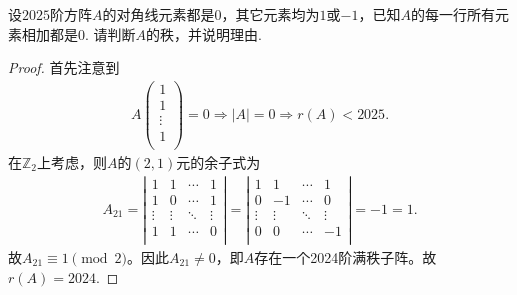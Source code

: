 \documentclass[../../main.tex]{subfiles}%
\begin{document}
\begin{example}
设$2025$阶方阵$A$的对角线元素都是$0$，其它元素均为$1$或$-1$，已知$A$的每一行所有元素相加都是$0$. 请判断$A$的秩，并说明理由.
\end{example}
\begin{proof}

首先注意到
\begin{align*}
A\left( \begin{array}{c}
1\\
1\\
\vdots\\
1\\
\end{array} \right) =0\Longrightarrow \left| A \right|=0\Longrightarrow r\left( A \right) <2025.
\end{align*}
在$\mathbb{Z}_2$上考虑，则$A$的$(2,1)$元的余子式为
\begin{align*}
A_{21}=\left| \begin{matrix}
1&		1&		\cdots&		1\\
1&		0&		\cdots&		1\\
\vdots&		\vdots&		\ddots&		\vdots\\
1&		1&		\cdots&		0\\
\end{matrix} \right|=\left| \begin{matrix}
1&		1&		\cdots&		1\\
0&		-1&		\cdots&		0\\
\vdots&		\vdots&		\ddots&		\vdots\\
0&		0&		\cdots&		-1\\
\end{matrix} \right|=-1=1.
\end{align*}
故$A_{21}\equiv 1 \pmod{2}$。因此$A_{21}\ne 0$，即$A$存在一个2024阶满秩子阵。故$r\left( A \right) =2024$.

\end{proof}
\end{document}
